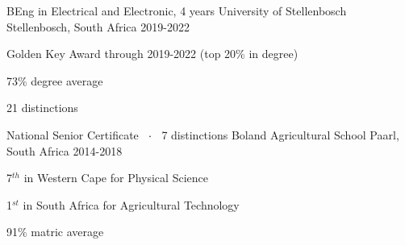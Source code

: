 

\begin{cventries}

  \cventry
    {BEng in Electrical and Electronic, 4 years} %
    {University of Stellenbosch} %
    {Stellenbosch, South Africa} %
    {2019-2022} %
    {
      \begin{cvitems} %
        \item {Golden Key Award through 2019-2022 (top 20\% in degree)}
        \item {73\% degree average}
        \item {21 distinctions}
      \end{cvitems}
    }
  \cventry
{National Senior Certificate ${\enskip\cdotp\enskip}$ 7 distinctions} %
{Boland Agricultural School } %
{Paarl, South Africa} %
{2014-2018} %
{
	  \begin{cvitems} %
	  	\item {7$^{th}$ in Western Cape for Physical Science}
	  	\item {1$^{st}$ in South Africa for Agricultural Technology}
	  	\item {91\% matric average }
	  \end{cvitems}
}

\end{cventries}
